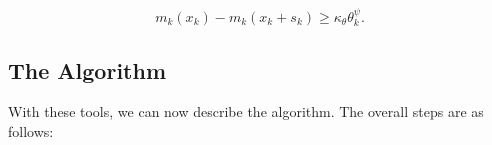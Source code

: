 \documentclass{article}
\begin{document}
\begin{equation}
\label{predicted_decrease}
m_k(x_k) - m_k(x_k+s_k) \ge \kappa_{\theta} \theta_k^{\psi}.
\end{equation}



\newpage
\subsection{The Algorithm}

With these tools, we can now describe the algorithm.
The overall steps are as follows:
\end{document}
